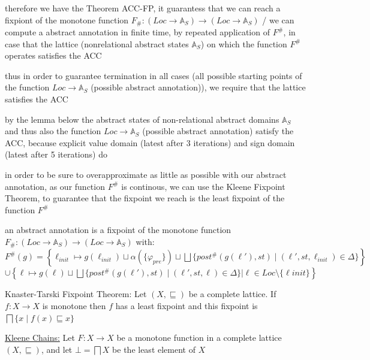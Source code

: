 \documentclass[a4paper]{article}
\begin{document}
\begin{minipage}[t]{0.16\linewidth}
\begin{betterlist}
{{\begin{betterlist}
\begin{betterlist}
						\item therefore we have the Theorem ACC-FP, it guarantess that we can reach a fixpiont of the monotone function $F_\#  : (Loc \rightarrow \mathbb{A}_S) \rightarrow (Loc \rightarrow \mathbb{A}_S)$ / we can compute a abstract annotation in finite time, by repeated application of $F^\#$, in case that the lattice (nonrelational abstract states $\mathbb{A}_S$) on which the function $F^\#$ operates satisfies the ACC
						\begin{betterlist}
							\item thus in order to guarantee termination in all cases (all possible starting points of the function $Loc \rightarrow \mathbb{A}_S$ (possible abstract annotation)), we require that the lattice satisfies the ACC
							\item by the lemma below the abstract states of non-relational abstract domains $\mathbb{A}_S$ and thus also the function $Loc \rightarrow \mathbb{A}_S$ (possible abstract annotation) satisfy the ACC, because explicit value domain (latest after 3 iterations) and sign domain (latest after 5 iterations) do
						\end{betterlist}
						\item in order to be sure to overapproximate as little as possible with our abstract annotation, as our function $F^\#$ is continous, we can use the Kleene Fixpoint Theorem, to guarantee that the fixpoint we reach is the least fixpoint of the function $F^\#$%
						\item an abstract annotation is a fixpoint of the monotone function $F_\#  : (Loc \rightarrow \mathbb{A}_S) \rightarrow (Loc \rightarrow \mathbb{A}_S)$ with:\\$F^\# (g) = \left\{\ell_{init} \mapsto g(\ell_{init}) \sqcup \alpha(\{\varphi_{pre}\}) \sqcup \bigsqcup \{post^\#(g(\ell'), st) \mid (\ell', st, \ell_{init}) \in \Delta \}\right\}$\\$\cup  \left\{\ell \mapsto g(\ell) \sqcup  \bigsqcup \{post^\#(g(\ell'), st) \mid (\ell', st, \ell) \in \Delta \} | \ell \in Loc \setminus \{ \ell init\}\right\}$
							\item \alert{Knaster-Tarski Fixpoint Theorem}: Let $(X, \sqsubseteq)$ be a complete lattice. If $f:X \rightarrow X$ is monotone then $f$ has a least fixpoint and this fixpoint is $\bigsqcap \{x \mid f(x) \sqsubseteq x\}$
							\item \underline{Kleene Chains:} Let $F : X \rightarrow X$ be a monotone function in a complete lattice $(X, \sqsubseteq)$, and let $\bot = \bigsqcap X$ be the least element of $X$

\end{betterlist}
\end{betterlist}}}
\end{betterlist}
\end{minipage}
\end{document}
